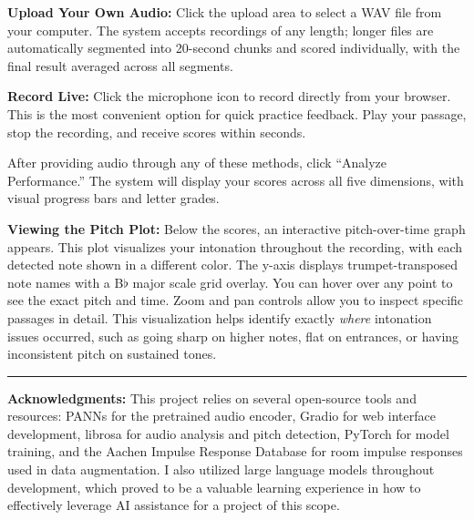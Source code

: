 \documentclass[10pt, a4paper, twocolumn]{article}
\begin{document}
\textbf{Upload Your Own Audio:} Click the upload area to select a WAV file from your computer. The system accepts recordings of any length; longer files are automatically segmented into 20-second chunks and scored individually, with the final result averaged across all segments.

\textbf{Record Live:} Click the microphone icon to record directly from your browser. This is the most convenient option for quick practice feedback. Play your passage, stop the recording, and receive scores within seconds.

After providing audio through any of these methods, click ``Analyze Performance.'' The system will display your scores across all five dimensions, with visual progress bars and letter grades.

\textbf{Viewing the Pitch Plot:} Below the scores, an interactive pitch-over-time graph appears. This plot visualizes your intonation throughout the recording, with each detected note shown in a different color. The y-axis displays trumpet-transposed note names with a B$\flat$ major scale grid overlay. You can hover over any point to see the exact pitch and time. Zoom and pan controls allow you to inspect specific passages in detail. This visualization helps identify exactly \emph{where} intonation issues occurred, such as going sharp on higher notes, flat on entrances, or having inconsistent pitch on sustained tones.

\vspace{1em}
\hrule
\vspace{0.5em}
\small
\textbf{Acknowledgments:} This project relies on several open-source tools and resources: PANNs for the pretrained audio encoder, Gradio for web interface development, librosa for audio analysis and pitch detection, PyTorch for model training, and the Aachen Impulse Response Database for room impulse responses used in data augmentation. I also utilized large language models throughout development, which proved to be a valuable learning experience in how to effectively leverage AI assistance for a project of this scope.
\end{document}
